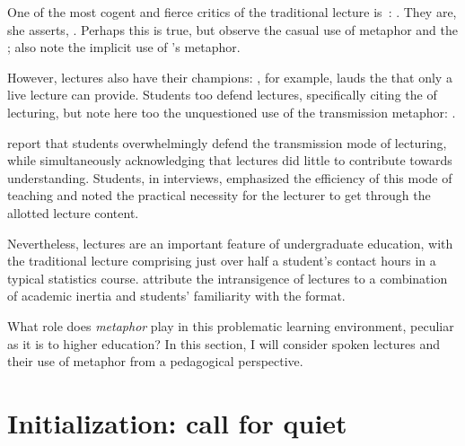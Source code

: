 One of the most cogent and fierce critics of the traditional lecture
is~: .  They are, she asserts, .  Perhaps this is true, but observe the casual use of
 metaphor and the ; also note the implicit use of \citeauthor{sfard1998}'s
 metaphor.

However, lectures also have their champions: , for
example, lauds the  that only a live lecture can provide.
Students too defend lectures, specifically citing the
 of lecturing, but note here too the unquestioned
use of the transmission metaphor: .

 report that students overwhelmingly defend the
transmission mode of lecturing, while simultaneously acknowledging
that lectures did little to contribute towards understanding.
Students, in interviews, emphasized the efficiency of this mode of
teaching and noted the practical necessity for the lecturer to get
through the allotted lecture content.


Nevertheless, lectures are an important feature of undergraduate
education, with the traditional lecture comprising just over half a
student's contact hours in a typical statistics course.
 attribute the intransigence of lectures to a
combination of academic inertia and students' familiarity with the
format.

What role does \emph{metaphor} play in this problematic learning
environment, peculiar as it is to higher education?  In this section,
I will consider spoken lectures and their use of metaphor from a
pedagogical perspective.

\section{Initialization: call for quiet}

